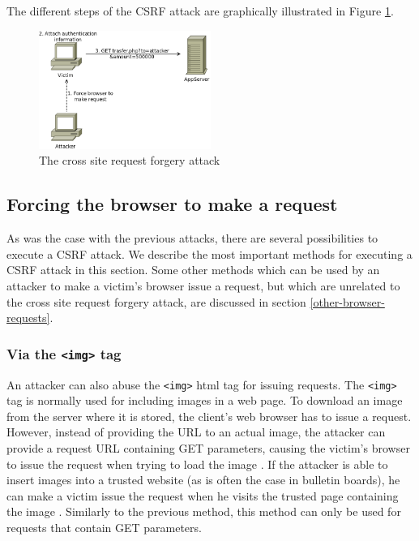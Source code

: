 The different steps of the CSRF attack are graphically illustrated in Figure \ref{fig:csrf}.

\begin{figure}[htb]
	\centering
	\includegraphics[width=0.50\textwidth]{img/csrf.png}
	\caption{The cross site request forgery attack}
	\label{fig:csrf}
\end{figure}

\subsection{Forcing the browser to make a request}\label{forcing-request}

As was the case with the previous attacks, there are several possibilities to execute a CSRF attack. We describe the most important methods for executing a CSRF attack in this section. Some other methods which can be used by an attacker to make a victim's browser issue a request, but which are unrelated to the cross site request forgery attack, are discussed in section \ref{other-browser-requests}.

\subsubsection{Via the \texttt{<img>} tag}

An attacker can also abuse the \texttt{<img>} \gls{html} tag for issuing requests. The \texttt{<img>} tag is normally used for including images in a web page. To download an image from the server where it is stored, the client's web browser has to issue a request. However, instead of providing the URL to an actual image, the attacker can provide a request URL containing GET parameters, causing the victim's browser to issue the request when trying to load the image \cite{Johns2006b}. If the attacker is able to insert images into a trusted website (as is often the case in bulletin boards), he can make a victim issue the request when he visits the trusted page containing the image \cite{Barth2008}. Similarly to the previous method, this method can only be used for requests that contain GET parameters.

